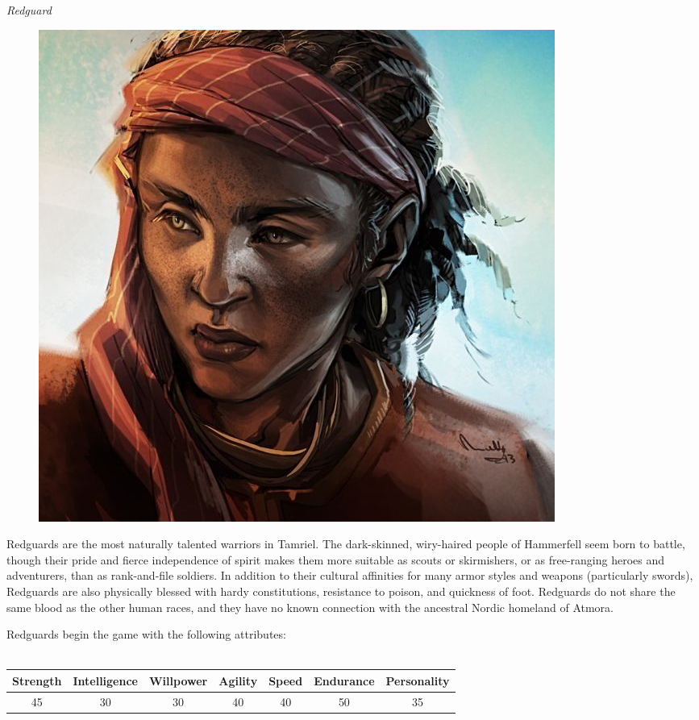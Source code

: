 \documentclass[12pt]{article}
\begin{document}
\noindent
\textit{Redguard}
\begin{figure}
	\includegraphics[width=\textwidth]{Redguard.png}
\end{figure}

Redguards are the most naturally talented warriors in Tamriel. The dark-skinned, wiry-haired people of Hammerfell seem born to battle, though their pride and fierce independence of spirit makes them more suitable as scouts or skirmishers, or as free-ranging heroes and adventurers, than as rank-and-file soldiers. In addition to their cultural affinities for many armor styles and weapons (particularly swords), Redguards are also physically blessed with hardy constitutions, resistance to poison, and quickness of foot. Redguards do not share the same blood as the other human races, and they have no known connection with the ancestral Nordic homeland of Atmora.

Redguards begin the game with the following attributes:\\~\\
\begin{tabular}{|c|c|c|c|c|c|c|}
\hline
Strength & Intelligence & Willpower & Agility & Speed & Endurance & Personality\\ \hline
45 & 30 & 30 & 40 & 40 & 50 & 35\\ \hline

\end{tabular}\\
\end{document}
